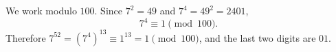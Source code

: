 We work modulo $100$. Since $7^2=49$ and $7^4=49^2=2401$,
\[7^4\equiv1\pmod{100}.\]
Therefore $7^{52}=\left(7^4\right)^{13}\equiv1^{13}=1\pmod{100}$, and the last two digits are $\boxed{01}$.
